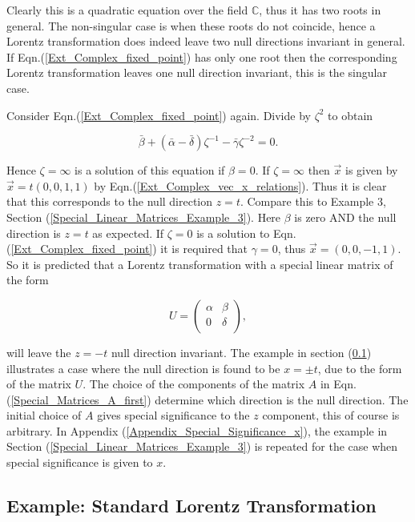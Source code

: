 \noindent Clearly this is a quadratic equation over the field $\mathbb{C}$, thus it has two roots in general. The non-singular case is when these roots do not coincide, hence a Lorentz transformation does indeed leave two null directions invariant in general.  If Eqn.(\ref{Ext_Complex_fixed_point}) has only one root then the corresponding Lorentz transformation leaves one null direction invariant, this is the singular case.

Consider Eqn.(\ref{Ext_Complex_fixed_point}) again. Divide by $\zeta^2$ to obtain

\begin{equation*}
\bar{\beta} + (\bar{\alpha}- \bar{\delta})\zeta^{-1} - \bar{\gamma}\zeta^{-2} = 0.
\end{equation*}

\noindent Hence $\zeta = \infty$ is a solution of this equation if $\beta = 0$. If $\zeta = \infty$ then $\vec{x}$ is given by $\vec{x} = t(0,0,1,1)$ by Eqn.(\ref{Ext_Complex_vec_x_relations}). Thus it is clear that this corresponds to the null direction $z=t$. Compare this to Example 3, Section (\ref{Special_Linear_Matrices_Example_3}). Here $\beta$ is zero AND the null direction is $z=t$ as expected. If $\zeta = 0$ is a solution to Eqn.(\ref{Ext_Complex_fixed_point}) it is required that $\gamma = 0$, thus $\vec{x} = (0,0,-1,1)$. So it is predicted that a Lorentz transformation with a special linear matrix of the form

\begin{equation*}   
U = 
\left(
\begin{array}{cc}
\alpha & \beta \\
0 & \delta \\
\end{array}
\right),
\end{equation*}   

\noindent will leave the $z=-t$ null direction invariant. The example in section (\ref{Ext_Complex_Ex_end}) illustrates a case where the null direction is found to be $x=\pm t$, due to the form of the matrix $U$. The choice of the components of the matrix $A$ in Eqn.(\ref{Special_Matrices_A_first}) determine which direction is the null direction. The initial choice of $A$ gives special significance to the $z$ component, this of course is arbitrary. In Appendix (\ref{Appendix_Special_Significance_x}), the example in Section (\ref{Special_Linear_Matrices_Example_3}) is repeated for the case when special significance is given to $x$. 

\subsection{Example: Standard Lorentz Transformation}\label{Ext_Complex_Ex_end}

